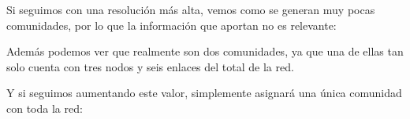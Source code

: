 Si seguimos con una resolución más alta, vemos como se generan muy pocas comunidades, por lo que la información que aportan no es relevante:

\begin{table}[H]
\centering
{}
\caption{Tres comunidades obtenidas para un valor de resolución de $1.5$.}
\end{table}

Además podemos ver que realmente son dos comunidades, ya que una de ellas tan solo cuenta con tres nodos y seis enlaces del total de la red.

Y si seguimos aumentando este valor, simplemente asignará una única comunidad con toda la red:

\begin{table}[H]
\centering
{}
\caption{Comunidad obtenida para un valor de resolución de $2.5$.}
\end{table}

